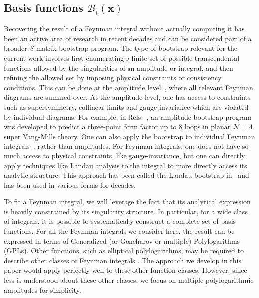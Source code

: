 \documentclass[a4paper,11pt]{article}
\begin{document}
\subsection{Basis functions $\mathcal{B}_i(\mathbf{x})$\label{sec:basis_set}}
Recovering the result of a Feynman integral without actually computing it has been an active area of research in recent decades and can be considered part of a broader $S$-matrix bootstrap program. The type of bootstrap relevant for the current work involves first enumerating a finite set of possible transcendental functions allowed by the singularities of an amplitude or integral,
and then refining the allowed set by imposing physical constraints or consistency conditions. This can be done at the amplitude level~\cite{Dixon:2016nkn,Caron-Huot:2016owq,Caron-Huot:2019vjl,Dixon:2020bbt,Dixon:2022rse,Basso:2024hlx,Cai:2024znx,Cai:2025atc,Guo:2021bym}, where all relevant Feynman diagrams are summed over. At the amplitude level, one has access to constraints such as supersymmetry, collinear limits and gauge invariance which are violated by individual diagrams. For example, in Refs.~\cite{Dixon:2020bbt, Dixon:2022rse}, an amplitude bootstrap program was developed to predict a three-point form factor up to 8 loops in planar $\mathcal{N}=4$ super Yang-Mills theory. One can also apply the bootstrap to individual Feynman integrals~\cite{Chicherin:2017dob,Caron-Huot:2018dsv,Henn:2018cdp,He:2021fwf,He:2021eec,Morales:2022csr}, rather than amplitudes. For Feynman integrals, one does not have so much access to physical constraints, like gauge-invariance, but one can directly apply techniques like Landau analysis to the integral to more directly access its analytic structure.
This approach has been called the Landau bootstrap in~\cite{Hannesdottir:2024hke} and has been used in various forms for decades.


To fit a Feynman integral, we will leverage the fact that its analytical expression is heavily constrained by its singularity structure. In particular, for a wide class of integrals, it is possible to systematically construct a complete set of basis functions. For all the Feynman integrals we consider here, the result can be expressed in terms of Generalized (or Goncharov or multiple) Polylogarithms~\cite{Goncharov:1998kja, Goncharov:2010jf, Duhr:2012fh} (GPLs). Other functions, such as elliptical polylogarithms, may be required to describe other classes of Feynman integrals \cite{Georgoudis:2015hca, Bourjaily:2018ycu, Duhr:2022dxb, Bourjaily:2022bwx}. The approach we develop in this paper would apply perfectly well to these other function classes. However, since less is understood about these other classes, we focus on multiple-polylogarithmic amplitudes for simplicity.
\end{document}
